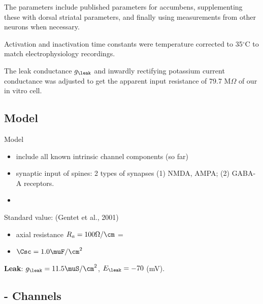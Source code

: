 The parameters include published parameters for accumbens, supplementing
these with dorsal striatal parameters, and finally using measurements
from other neurons when necessary.

Activation and inactivation time constants were temperature corrected to
35$^\circ$C to match electrophysiology recordings.

The leak conductance $g_\leak$ and inwardly rectifying potassium current
conductance was adjusted to get the apparent input resistance of 79.7 M$\Omega$
of our in vitro cell.

\subsection{Model}



Model
\begin{itemize}
  
  \item  include all known intrinsic channel components (so far)
  
  \item synaptic input of spines: 2 types of synapses (1) NMDA, AMPA; 
  (2) GABA-A receptors.
  
  \item 
\end{itemize}

Standard value: (Gentet et al., 2001)
\begin{itemize}
  \item axial resistance $R_a = 100 \Omega/\cm$ = 
  
  \item $\Csc = 1.0 \muF/\cm^2$
\end{itemize} 

{\bf Leak}: $g_\leak = 11.5 \muS/\cm^2$, $E_\leak = -70$ (mV).

\subsection{- Channels}

